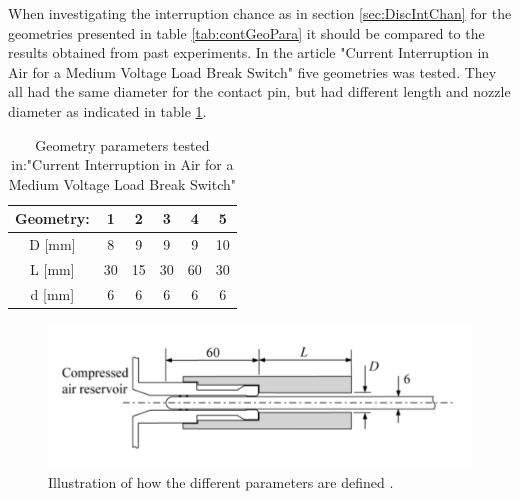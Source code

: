 \documentclass[10pt,a4paper,twoside]{article}
\begin{document}
\makeatletter 
\renewcommand{\thetable}{B.\@arabic\c@table}
\makeatother

When investigating the interruption chance as in section \ref{sec:DiscIntChan} for the geometries presented in table \ref{tab:contGeoPara} it should be compared to the results obtained from past experiments. In the article "Current Interruption in Air for a Medium Voltage Load Break Switch" \cite{bib:CIAMVLBS} five geometries was tested. They all had the same diameter for the contact pin, but had different length and nozzle diameter as indicated in table \ref{tab:contactParaMVALBS}.
\begin{table} [H]
\center
\caption{Geometry parameters tested in:"Current Interruption in Air for a Medium Voltage Load Break Switch"}
\begin{tabular}{|c|c|c|c|c|c|}
\hline 
Geometry: & 1 & 2 & 3 & 4 & 5 \\ 
\hline 
D [mm] & 8 & 9 & 9 & 9 & 10 \\ 
\hline 
L [mm] & 30 & 15 & 30 & 60 & 30 \\ 
\hline 
d [mm] & 6 & 6 & 6 & 6 & 6 \\ 
\hline 
\end{tabular}
\label{tab:contactParaMVALBS}
\end{table}

\begin{figure}[H]
\centering
	\includegraphics[scale=0.6]{Bilder/Discussion/paraDefine.png}
	\caption{Illustration of how the different parameters are defined  \cite{bib:CIAMVLBS}.}
	\label{fig:paraDefMVALBS}
\end{figure}
\end{document}
